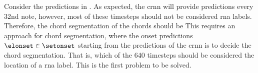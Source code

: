 
Consider the predictions in . As
expected, the \gls{crnn} will provide predictions every
\gls{32nd} note, however, most of these timesteps should not
be considered \gls{rna} labels. Therefore, the chord segmentation of the chords should be This requires an approach
for chord segmentation, where the onset predictions
$\elonset \in \setonset$ starting from the predictions of
the \gls{crnn} is to decide the chord segmentation. That is,
which of the 640 timesteps should be considered the location
of a \gls{rna} label. This is the first problem to be
solved.
